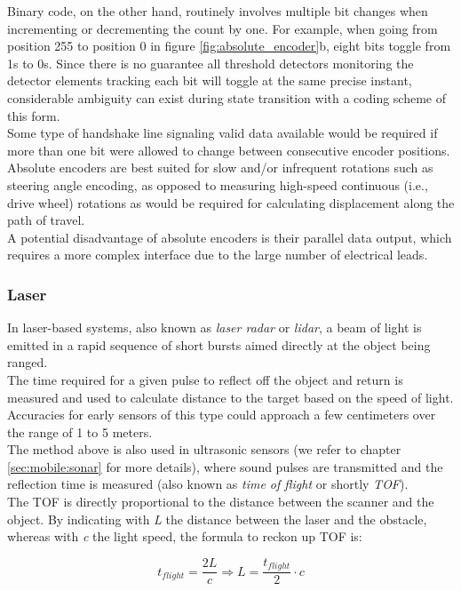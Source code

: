 Binary code, on the other hand, routinely involves multiple bit changes when
incrementing or decrementing the count by one. For example, when going from
position 255 to position 0 in figure \ref{fig:absolute_encoder}b, eight
bits toggle from 1s to 0s. Since
there is no guarantee all threshold detectors monitoring the detector elements
tracking each bit will toggle at the same precise instant, considerable ambiguity
can exist during state transition with a coding scheme of this form.
\\
Some type of handshake line signaling valid data available would be required
if more than one bit were allowed to change between consecutive encoder positions.
\\
Absolute encoders are best suited for slow and/or infrequent rotations such
as steering angle encoding, as opposed to measuring high-speed continuous
(i.e., drive wheel) rotations as would be required for calculating displacement
along the path of travel.
\\
A potential disadvantage of absolute encoders is their parallel data output,
which requires a more complex interface due to the large number of electrical leads.


\subsubsection{Laser}
\label{sec:mobile:laser}

In laser-based systems, also known as \textit{laser radar} or
\textit{lidar}, a beam of light is emitted in a rapid sequence
of short bursts aimed directly at the object being ranged.
\\
The time required for a given pulse to reflect off the object
and return is measured and used to calculate distance to the
target based on the speed of light. Accuracies for early sensors
of this type could approach a few centimeters over the range
of 1 to 5 meters.
\\
The method above is also used in ultrasonic sensors (we refer to
chapter \ref{sec:mobile:sonar} for more details), where sound pulses
are transmitted and the reflection time is measured (also known as
\textit{time of flight} or shortly \textit{TOF}).
\\
The TOF is directly proportional to the distance between the scanner
and the object. By indicating with \textit{L} the distance between
the laser and the obstacle, whereas with \textit{c} the light speed,
the formula to reckon up TOF is:

\[
t_{flight} = \frac{2L}{c}  \Longrightarrow  L = \frac{t_{flight}}{2}\cdot c
\]

